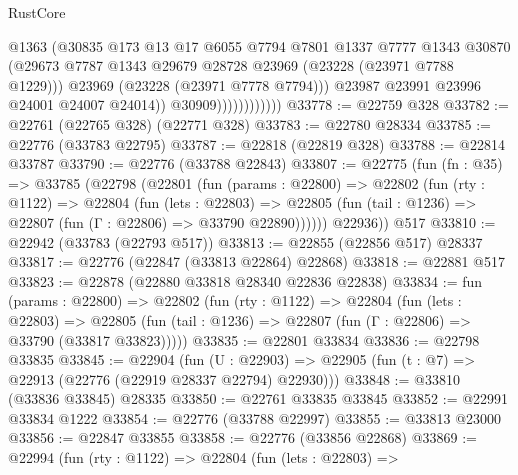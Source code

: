 \begin{lexlean}{RustCore}
\begin{coremodule}
                                @1363
                                (@30835
                                  @173
                                  @13
                                  @17
                                  @6055
                                  @7794
                                  @7801
                                  @1337
                                  @7777
                                  @1343
                                  @30870
                                  (@29673
                                    @7787
                                    @1343
                                    @29679
                                    @28728
                                    @23969
                                    (@23228 (@23971 @7788 @1229)))
                                  @23969
                                  (@23228 (@23971 @7778 @7794)))
                                @23987
                                @23991
                                @23996
                                @24001
                                @24007
                                @24014))
                            @30909))))))))))))
@33778 := @22759 @328
@33782 := @22761 (@22765 @328) (@22771 @328)
@33783 := @22780 @28334
@33785 := @22776 (@33783 @22795)
@33787 := @22818 (@22819 @328)
@33788 := @22814 @33787
@33790 := @22776 (@33788 @22843)
@33807 := @22775
    (fun (fn : @35) =>
    @33785
      (@22798
        (@22801
          (fun (params : @22800) =>
          @22802
            (fun (rty : @1122) =>
            @22804
              (fun (lets : @22803) =>
              @22805 (fun (tail : @1236) => @22807 (fun (Γ : @22806) => @33790 @22890))))))
        @22936))
    @517
@33810 := @22942 (@33783 (@22793 @517))
@33813 := @22855 (@22856 @517) @28337
@33817 := @22776 (@22847 (@33813 @22864) @22868)
@33818 := @22881 @517
@33823 := @22878 (@22880 @33818 @28340 @22836 @22838)
@33834 := fun (params : @22800) =>
  @22802
    (fun (rty : @1122) =>
    @22804
      (fun (lets : @22803) =>
      @22805 (fun (tail : @1236) => @22807 (fun (Γ : @22806) => @33790 (@33817 @33823)))))
@33835 := @22801 @33834
@33836 := @22798 @33835
@33845 := @22904
    (fun (U : @22903) => @22905 (fun (t : @7) => @22913 (@22776 (@22919 @28337 @22794) @22930)))
@33848 := @33810 (@33836 @33845) @28335
@33850 := @22761 @33835 @33845
@33852 := @22991 @33834 @1222
@33854 := @22776 (@33788 @22997)
@33855 := @33813 @23000
@33856 := @22847 @33855
@33858 := @22776 (@33856 @22868)
@33869 := @22994
    (fun (rty : @1122) =>
    @22804
      (fun (lets : @22803) =>

\end{coremodule}
\end{lexlean}

